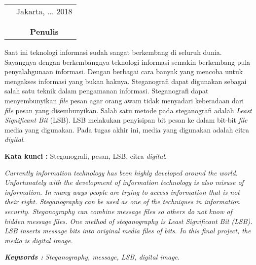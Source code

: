\documentclass{jtetiskripsi}
\begin{document}
\begin{tabular}{p{7.5cm}c}
	&Jakarta, ... 2018\\
	&\\
	&\\
	&\textbf{Penulis}
\end{tabular}


\tableofcontents 
{}
\listoffigures
{}
\listoftables
{}

\begin{abstractind}
	Saat ini teknologi informasi sudah sangat berkembang di seluruh dunia. Sayangnya dengan berkembangnya teknologi informasi semakin berkembang pula penyalahgunaan informasi. Dengan berbagai cara banyak yang mencoba untuk mengakses informasi yang bukan haknya. Steganografi dapat digunakan sebagai salah satu teknik dalam pengamanan informasi. Steganografi dapat menyembunyikan \emph{file} pesan agar orang awam tidak menyadari keberadaan dari \emph{file} pesan yang disembunyikan. Salah satu metode pada steganografi adalah \emph{Least Significant Bit} (LSB). LSB melakukan penyisipan bit pesan ke dalam bit-bit \emph{file} media yang digunakan. Pada tugas akhir ini, media yang digunakan adalah citra \emph{digital}.
	
	\bigskip
	\noindent
	\textbf{Kata kunci :} Steganografi, pesan, LSB, citra \emph{digital}.
\end{abstractind}

\begin{abstracteng}
	\textit{Currently information technology has been highly developed around the world. Unfortunately with the development of information technology is also misuse of information. In many ways people are trying to access information that is not their right. Steganography can be used as one of the techniques in information security. Steganography can combine message files so others do not know of hidden message files. One method of steganography is Least Significant Bit (LSB). LSB inserts message bits into original media files of bits. In this final project, the media is digital image.}    
	
	\bigskip
	\noindent
	\textbf{\emph{Keywords :}} \emph{Steganography, message, LSB, digital image}.
\end{abstracteng}
\begin{counterpage}
\end{counterpage}

\end{document}
